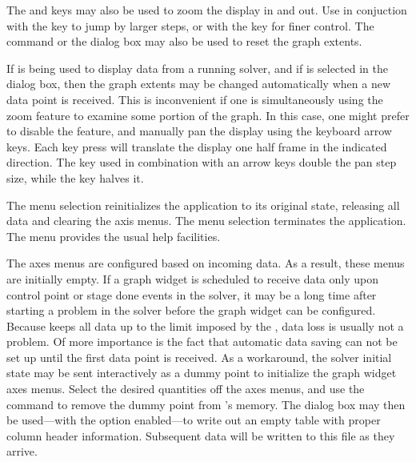 The  and  keys may also be used to zoom the
display in and out.  Use in conjuction with the  key to jump
by larger steps, or with the  key for finer control.  The
 command or the
 dialog box may also be used to reset the
graph extents.

If  is being used to display data from a running solver,
and if  is selected in the
 dialog box, then the graph extents
may be changed automatically when a new data point is received.  This is
inconvenient if one is simultaneously using the zoom feature to examine
some portion of the graph.  In this case, one might prefer to disable
the  feature, and manually pan the display using the
keyboard arrow keys.  Each key press will translate the display one half
frame in the indicated direction.  The  key used in
combination with an arrow keys double the pan step size, while the
 key halves it.

The menu selection  reinitializes the
 application to its original state, releasing all data and
clearing the axis menus.  The menu selection 
terminates the application.  The menu  provides the usual help
facilities.

The axes menus are configured based on incoming data.  As a result,
these menus are initially empty.  If a graph widget is scheduled to
receive data only upon control point or stage done events in the solver,
it may be a long time after starting a problem in the solver before the
graph widget can be configured.  Because  keeps all data up
to the limit imposed by the , data loss is usually
not a problem.  Of more importance is the fact that automatic data
saving can not be set up until the first data point is
received.  As a workaround, the solver initial state may be sent
interactively as a dummy point to initialize the graph widget axes
menus.  Select the desired quantities off the axes menus, and use the
 command to remove the dummy point from
's memory.  The {} dialog box may
then be used---with the {} option enabled---to write out
an empty table with proper column header information.  Subsequent data
will be written to this file as they arrive.



